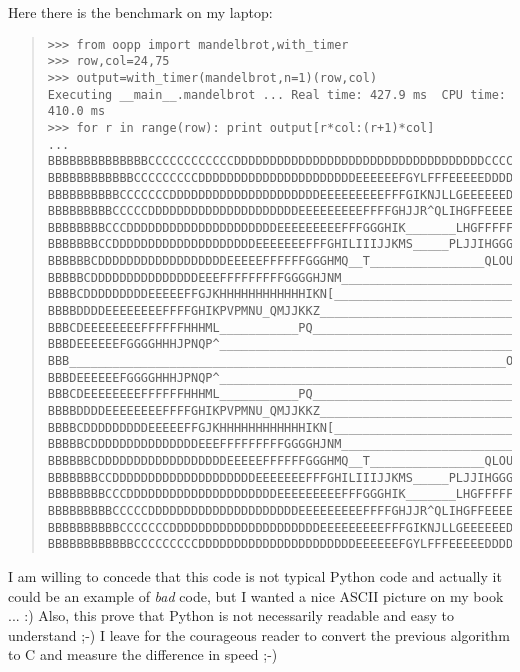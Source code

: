 \documentclass[10pt,english]{article}
\begin{document}
Here there is the benchmark on my laptop:
\begin{quote}
\begin{verbatim}>>> from oopp import mandelbrot,with_timer
>>> row,col=24,75
>>> output=with_timer(mandelbrot,n=1)(row,col)
Executing __main__.mandelbrot ... Real time: 427.9 ms  CPU time: 410.0 ms
>>> for r in range(row): print output[r*col:(r+1)*col]
...
BBBBBBBBBBBBBBCCCCCCCCCCCCDDDDDDDDDDDDDDDDDDDDDDDDDDDDDDDDDDDCCCCCCCCCCCCCC
BBBBBBBBBBBBCCCCCCCCCDDDDDDDDDDDDDDDDDDDDDDEEEEEEFGYLFFFEEEEEDDDDDCCCCCCCCC
BBBBBBBBBBCCCCCCCDDDDDDDDDDDDDDDDDDDDDEEEEEEEEEFFFGIKNJLLGEEEEEEDDDDDDCCCCC
BBBBBBBBBCCCCCDDDDDDDDDDDDDDDDDDDDDEEEEEEEEEFFFFGHJJR^QLIHGFFEEEEEEDDDDDDCC
BBBBBBBBCCCDDDDDDDDDDDDDDDDDDDDDEEEEEEEEEFFFGGGHIK_______LHGFFFFFEEEEDDDDDD
BBBBBBBCCDDDDDDDDDDDDDDDDDDDDEEEEEEEFFFGHILIIIJJKMS_____PLJJIHGGGHJFEEDDDDD
BBBBBBCDDDDDDDDDDDDDDDDDDEEEEEFFFFFFGGGHMQ__T________________QLOUP[OGFEDDDD
BBBBBCDDDDDDDDDDDDDDDEEEFFFFFFFFFGGGGHJNM________________________XLHGFFEEDD
BBBBCDDDDDDDDDEEEEEFFGJKHHHHHHHHHHHHIKN[__________________________MJKGFEEDD
BBBBDDDDEEEEEEEEFFFFGHIKPVPMNU_QMJJKKZ_____________________________PIGFEEED
BBBCDEEEEEEEEFFFFFFHHHML___________PQ_______________________________TGFEEEE
BBBDEEEEEEFGGGGHHHJPNQP^___________________________________________IGFFEEEE
BBB_____________________________________________________________OKIHGFFEEEE
BBBDEEEEEEFGGGGHHHJPNQP^___________________________________________IGFFEEEE
BBBCDEEEEEEEEFFFFFFHHHML___________PQ_______________________________TGFEEEE
BBBBDDDDEEEEEEEEFFFFGHIKPVPMNU_QMJJKKZ_____________________________PIGFEEED
BBBBCDDDDDDDDDEEEEEFFGJKHHHHHHHHHHHHIKN[__________________________MJKGFEEDD
BBBBBCDDDDDDDDDDDDDDDEEEFFFFFFFFFGGGGHJNM________________________XLHGFFEEDD
BBBBBBCDDDDDDDDDDDDDDDDDDEEEEEFFFFFFGGGHMQ__T________________QLOUP[OGFEDDDD
BBBBBBBCCDDDDDDDDDDDDDDDDDDDDEEEEEEEFFFGHILIIIJJKMS_____PLJJIHGGGHJFEEDDDDD
BBBBBBBBCCCDDDDDDDDDDDDDDDDDDDDDEEEEEEEEEFFFGGGHIK_______LHGFFFFFEEEEDDDDDD
BBBBBBBBBCCCCCDDDDDDDDDDDDDDDDDDDDDEEEEEEEEEFFFFGHJJR^QLIHGFFEEEEEEDDDDDDCC
BBBBBBBBBBCCCCCCCDDDDDDDDDDDDDDDDDDDDDEEEEEEEEEFFFGIKNJLLGEEEEEEDDDDDDCCCCC
BBBBBBBBBBBBCCCCCCCCCDDDDDDDDDDDDDDDDDDDDDDEEEEEEFGYLFFFEEEEEDDDDDCCCCCCCCC\end{verbatim}
\end{quote}

I am willing to concede that this code is not typical Python code and
actually it could be an example of \emph{bad} code, but I wanted a nice ASCII 
picture on my book ... :) Also, this prove that Python is not necessarily 
readable and easy to understand ;-)
I leave for the courageous reader to convert the previous algorithm to C and
measure the difference in speed ;-)
\end{document}
